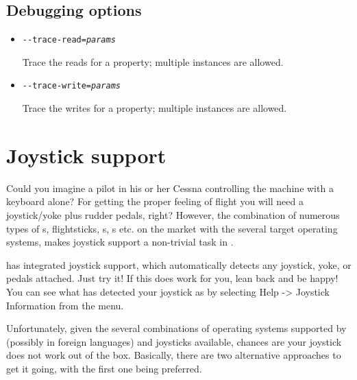 \subsection{Debugging options}
\begin{itemize}
\item{\texttt{-$ $-trace-read={\it params}}}

  Trace the reads for a property; multiple instances are allowed.

\item{\texttt{-$ $-trace-write={\it params}}}

  Trace the writes for a property; multiple instances are allowed.
\end{itemize}



\section{Joystick support\label{joysticksupp}}
Could you imagine a pilot in his or her Cessna controlling the machine with
a keyboard alone? For getting the proper feeling of flight you will need a
joystick/yoke plus rudder pedals, right? However, the combination of
numerous types of s, flightsticks, s,
s etc. on the market with the several target operating systems,
makes joystick support a non-trivial task in \FlightGear{}.

\FlightGear{} has integrated joystick support, which automatically detects
any joystick, yoke, or pedals attached. Just try it! If this does work for
you, lean back and be happy! You can see what \FlightGear{} has detected your
joystick as by selecting Help -> Joystick Information from the menu.

Unfortunately, given the several combinations of operating systems supported
by \FlightGear{} (possibly in foreign languages) and joysticks available,
chances are your joystick does not work out of the box. Basically, there are
two alternative approaches to get it going, with the first one being
preferred.


